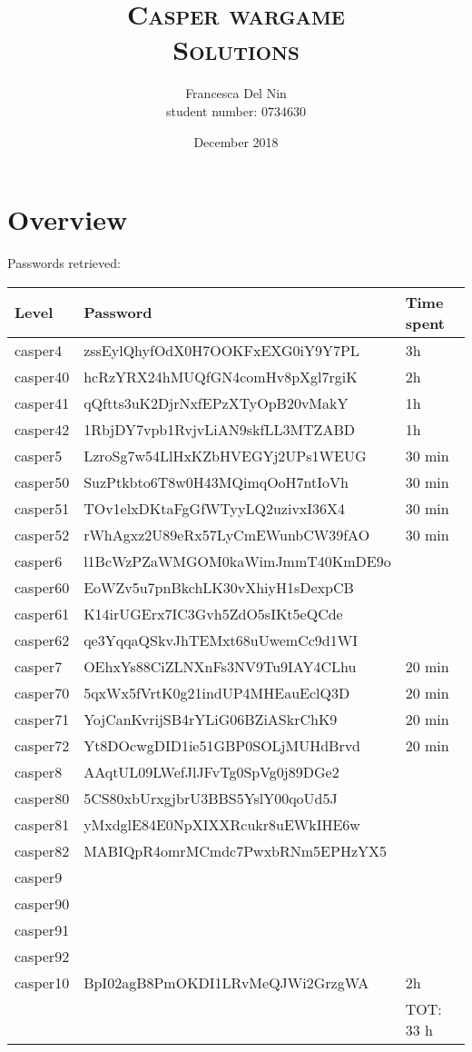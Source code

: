 \documentclass[a4paper,12pt]{article}
\title{\scshape Casper wargame \\ Solutions}
\author{Francesca Del Nin \\ student number: 0734630}
\date{December 2018}
\begin{document}
\maketitle

\tableofcontents

\newpage
\section{Overview}
Passwords retrieved:
\begin{table}[H]
\begin{tabular} {l|l|l}
 Level & Password & Time spent  \\
 \hline
 casper4 & zssEylQhyfOdX0H7OOKFxEXG0iY9Y7PL &  3h \\
 casper40 & hcRzYRX24hMUQfGN4comHv8pXgl7rgiK & 2h \\
 casper41 & qQftts3uK2DjrNxfEPzXTyOpB20vMakY & 1h \\
 casper42 & 1RbjDY7vpb1RvjvLiAN9skfLL3MTZABD & 1h \\
 \hline
 casper5 & LzroSg7w54LlHxKZbHVEGYj2UPs1WEUG & 30 min \\
 casper50 & SuzPtkbto6T8w0H43MQimqOoH7ntIoVh & 30 min\\
 casper51 & TOv1elxDKtaFgGfWTyyLQ2uzivxI36X4 & 30 min\\
 casper52 & rWhAgxz2U89eRx57LyCmEWunbCW39fAO & 30 min\\
 \hline
 casper6 & l1BcWzPZaWMGOM0kaWimJmmT40KmDE9o &  \\
 casper60 & EoWZv5u7pnBkchLK30vXhiyH1sDexpCB & \\
 casper61 & K14irUGErx7IC3Gvh5ZdO5sIKt5eQCde & \\
 casper62 & qe3YqqaQSkvJhTEMxt68uUwemCc9d1WI & \\
 \hline
 casper7 & OEhxYs88CiZLNXnFs3NV9Tu9IAY4CLhu & 20 min\\ 
 casper70 & 5qxWx5fVrtK0g21indUP4MHEauEclQ3D & 20 min \\
 casper71 & YojCanKvrijSB4rYLiG06BZiASkrChK9 & 20 min\\              casper72 & Yt8DOcwgDID1ie51GBP0SOLjMUHdBrvd &  20 min\\
 \hline
 casper8 & AAqtUL09LWefJlJFvTg0SpVg0j89DGe2 & \\
 casper80 & 5CS80xbUrxgjbrU3BBS5YslY00qoUd5J & \\
 casper81 & yMxdglE84E0NpXIXXRcukr8uEWkIHE6w & \\
 casper82 & MABIQpR4omrMCmdc7PwxbRNm5EPHzYX5 & \\
 \hline
 casper9 & & \\
 casper90 &   & \\
 casper91 & & \\
 casper92 & & \\
 \hline
	casper10 & BpI02agB8PmOKDI1LRvMeQJWi2GrzgWA & 2h \\
	\hline \hline
  	& & TOT: 33 h
\end{tabular}
\end{table}
\end{document}
